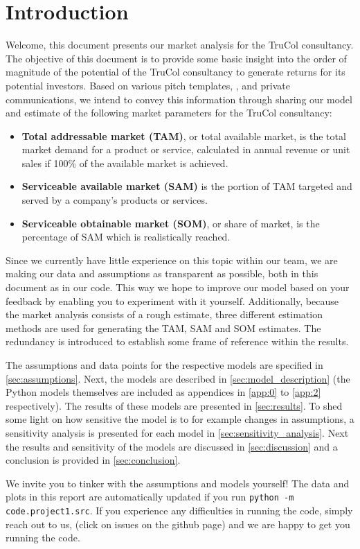 \section{Introduction}\label{sec:intro}
Welcome, this document presents our market analysis for the TruCol consultancy. The objective of this document is to provide some basic insight into the order of magnitude of the potential of the TruCol consultancy to generate returns for its potential investors. Based on various pitch templates, \cite{kamps2020}, and private communications, we intend to convey this information through sharing our model and estimate of the following market parameters for the TruCol consultancy:

\begin{itemize}
	\item \textbf{Total addressable market (TAM)}, or total available market, is the total market demand for a product or service, calculated in annual revenue or unit sales if 100\% of the available market is achieved\cite{tam_sam_som}.
	\item \textbf{Serviceable available market (SAM)} is the portion of TAM targeted and served by a company's products or services\cite{tam_sam_som}.
	\item \textbf{Serviceable obtainable market (SOM)}, or share of market, is the percentage of SAM which is realistically reached\cite{tam_sam_som}.
\end{itemize}


\noindent Since we currently have little experience on this topic within our team, we are making our data and assumptions as transparent as possible, both in this document as in our code. This way we hope to improve our model based on your feedback by enabling you to experiment with it yourself. Additionally, because the market analysis consists of a rough estimate, three different estimation methods are used for generating the TAM, SAM and SOM estimates. The redundancy is introduced to establish some frame of reference within the results. %

The assumptions and data points for the respective models are specified in \cref{sec:assumptions}. Next, the models are described in \cref{sec:model_description} (the Python models themselves are included as appendices in \cref{app:0} to \cref{app:2} respectively). The results of these models are presented in \cref{sec:results}. To shed some light on how sensitive the model is to for example changes in assumptions, a sensitivity analysis is presented for each model in \cref{sec:sensitivity_analysis}. Next the results and sensitivity of the models are discussed in \cref{sec:discussion} and a conclusion is provided in \cref{sec:conclusion}.

We invite you to tinker with the assumptions and models yourself! The data and plots in this report are automatically updated if you run \verb+python -m code.project1.src+. If you experience any difficulties in running the code, simply reach out to us, (click on issues on the github page) and we are happy to get you running the code.
